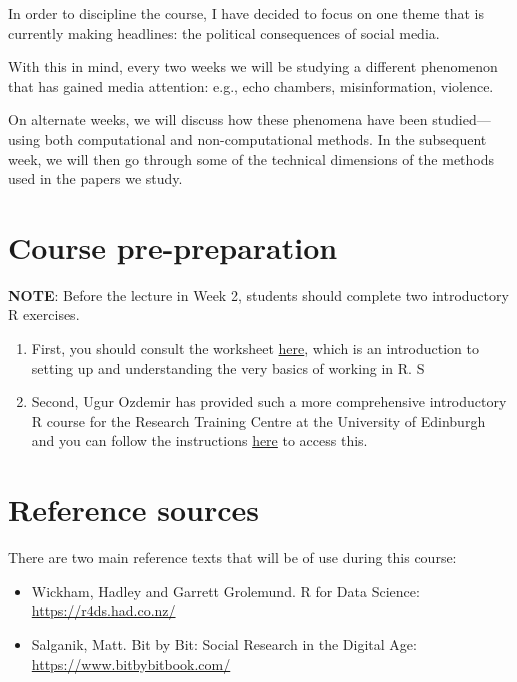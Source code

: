 \documentclass[
  letterpaper,
  DIV=11,
  numbers=noendperiod]{scrreprt}
\providecommand{\tightlist}{%
  \setlength{\itemsep}{0pt}\setlength{\parskip}{0pt}}\usepackage{longtable,booktabs,array}
\begin{document}
In order to discipline the course, I have decided to focus on one theme
that is currently making headlines: the political consequences of social
media.

With this in mind, every two weeks we will be studying a different
phenomenon that has gained media attention: e.g., echo chambers,
misinformation, violence.

On alternate weeks, we will discuss how these phenomena have been
studied---using both computational and non-computational methods. In the
subsequent week, we will then go through some of the technical
dimensions of the methods used in the papers we study.

\hypertarget{course-pre-preparation}{%
\section*{Course pre-preparation}\label{course-pre-preparation}}

\textbf{NOTE}: Before the lecture in Week 2, students should complete
two introductory R exercises.

\begin{enumerate}
\def\labelenumi{\arabic{enumi}.}
\item
  First, you should consult the worksheet
  \href{https://cjbarrie.github.io/CS-ED/intro.html}{here}, which is an
  introduction to setting up and understanding the very basics of
  working in R. S
\item
  Second, Ugur Ozdemir has provided such a more comprehensive
  introductory R course for the Research Training Centre at the
  University of Edinburgh and you can follow the instructions
  \href{https://research-training-centre.sps.ed.ac.uk/micro-methods/}{here}
  to access this.
\end{enumerate}

\hypertarget{reference-sources}{%
\section*{Reference sources}\label{reference-sources}}

There are two main reference texts that will be of use during this
course:

\begin{itemize}
\tightlist
\item
  Wickham, Hadley and Garrett Grolemund. R for Data Science:
  \url{https://r4ds.had.co.nz/}
\item
  Salganik, Matt. Bit by Bit: Social Research in the Digital Age:
  \url{https://www.bitbybitbook.com/}
\end{itemize}
\end{document}
